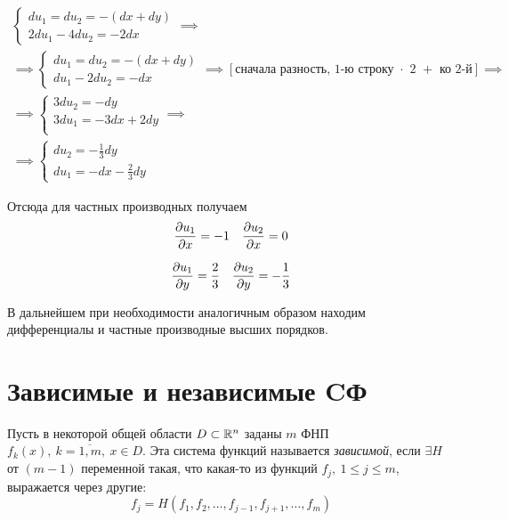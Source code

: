 \documentclass[../../main.tex]{subfiles}
\begin{document}
\begin{exmp}
    \[
    \begin{array}{l}
    \begin{cases}
        du_1 = du_2 = -\left(dx + dy\right) \\
        2du_1 - 4du_2 = -2dx
    \end{cases} \implies \\ \implies
    \begin{cases}
     du_1 = du_2 = -\left(dx + dy\right) \\
     du_1 - 2du_2 = -dx
    \end{cases} \implies
    \left[\text{сначала разность,
    1-ю строку $\cdot$ 2 $+$ ко 2-й}\right] \implies \\ \implies
    \begin{cases}
        3du_2 = -dy \\
        3du_1 = -3dx + 2dy \\
    \end{cases} \implies \\ \implies
    \begin{cases}
        du_2 = -\frac{1}{3}dy \\
        du_1 = -dx-\frac{2}{3}dy
    \end{cases}
    \end{array}
    \]

    Отсюда для частных производных получаем
    \[
    \pderiv{u_1}{x} = -1 \ \ \ 
    \pderiv{u_2}{x} = 0\\
    \]
    
    \[
    \frac{\partial u_1}{\partial y} = \frac{2}{3} \ \ \
    \frac{\partial u_2}{\partial y} = -\frac{1}{3}
    \]
    
    В дальнейшем при необходимости аналогичным образом
    находим дифференциалы и частные производные 
    высших порядков.
\end{exmp}

\section{Зависимые и независимые CФ}
Пусть в некоторой общей области $D \subset \mathbb{R}^n$ 
заданы $m$ ФНП
$f_k\left(x\right),\ k = \overline{1, m},\ x \in D$.
Эта система функций называется \emph{зависимой}, 
если $\exists H$ от $(m - 1)$ переменной такая, что 
какая-то из функций $f_j,\ 1 \leq j \leq m$, 
выражается через другие:
\begin{equation}
\label{lec9-depend}
f_j = H(f_1, f_2, \dots, f_{j-1}, f_{j+1}, \dots, f_m)
\end{equation}
\end{document}
